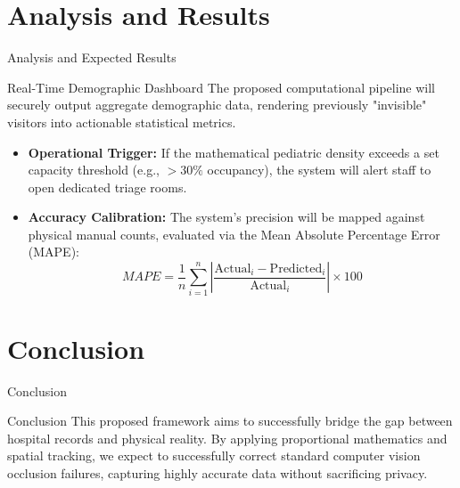 \documentclass[11pt, aspectratio=169]{beamer}
\begin{document}
\section{Analysis and Results}
\begin{frame}{Analysis and Expected Results}
    \begin{block}{Real-Time Demographic Dashboard}
        The proposed computational pipeline will securely output aggregate demographic data, rendering previously "invisible" visitors into actionable statistical metrics.
    \end{block}
    
    \vspace{0.2cm}
    \begin{itemize}
        \item \textbf{Operational Trigger:} If the mathematical pediatric density exceeds a set capacity threshold (e.g., $>30\%$ occupancy), the system will alert staff to open dedicated triage rooms.
        \item \textbf{Accuracy Calibration:} The system's precision will be mapped against physical manual counts, evaluated via the Mean Absolute Percentage Error (MAPE):
        \begin {equation} MAPE = \frac{1}{n}\sum_{i=1}^{n}\left|\frac{\text{Actual}_i - \text{Predicted}_i}{\text{Actual}_i}\right| \times 100 \end {equation}
    \end{itemize}
\end{frame}

\section{Conclusion}
\begin{frame}{Conclusion}
    \begin{block}{Conclusion}
        This proposed framework aims to successfully bridge the gap between hospital records and physical reality. By applying proportional mathematics and spatial tracking, we expect to successfully correct standard computer vision occlusion failures, capturing highly accurate data without sacrificing privacy.
    \end{block}
\end{frame}

\end{document}
